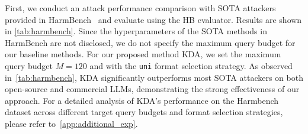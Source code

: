 


First, we conduct an attack performance comparison with SOTA attackers provided in HarmBench~\citep{mazeika_harmbench_2024} and evaluate using the HB evaluator. Results are shown in \autoref{tab:harmbench}. Since the hyperparameters of the SOTA methods in HarmBench are not disclosed, we do not specify the maximum query budget for our baseline methods. For our proposed method KDA, we set the maximum query budget $M=120$ and with the \texttt{uni} format selection strategy. As observed in~\autoref{tab:harmbench}, KDA significantly outperforms most SOTA attackers on both open-source and commercial LLMs, demonstrating the strong effectiveness of our approach. For a detailed analysis of KDA's performance on the Harmbench dataset across different target query budgets and format selection strategies, please refer to~\autoref{app:additional_exp}. 


